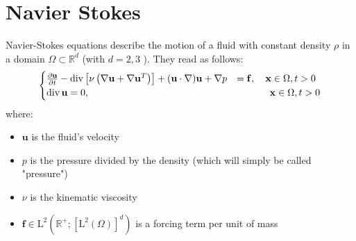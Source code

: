 \documentclass[11pt]{book}
\begin{document}
\chapter{Navier Stokes}
Navier-Stokes equations describe the motion of a fluid with constant density $\rho$ in a domain $\Omega \subset \mathbb{R}^{d}$ (with $d=2,3$ ). They read as follows:
\begin{align}
\begin{cases}
\frac{\partial \mathbf{u}}{\partial t}-\operatorname{div}\left[\nu\left(\nabla \mathbf{u}+\nabla \mathbf{u}^{T}\right)\right]+(\mathbf{u} \cdot \nabla) \mathbf{u}+\nabla p &= \mathbf{f}, \quad \mathbf{x} \in \Omega, t>0 \\
\operatorname{div} \mathbf{u} = 0, & \hspace{1.2cm} \mathbf{x} \in \Omega, t>0
\end{cases}
\end{align}
where:
\begin{itemize}
  \item $\mathbf{u}$ is the fluid's velocity
  \item $p$ is the pressure divided by the density (which will simply be called "pressure")
  \item $\nu$ is the kinematic viscosity
  \item $\mathbf{f} \in \mathrm{L}^{2}\left(\mathbb{R}^{+} ;\left[\mathrm{L}^{2}(\Omega)\right]^{d}\right)$ is a forcing term per unit of mass
\end{itemize}
\end{document}
